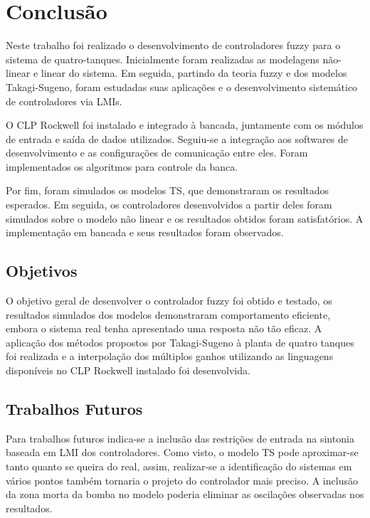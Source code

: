 %

\chapter{Conclusão} \label{capConclusao}
Neste trabalho foi realizado o desenvolvimento de controladores fuzzy para o sistema de quatro-tanques. Inicialmente foram realizadas as modelagens não-linear e linear do sistema. Em seguida, partindo da teoria fuzzy e dos modelos Takagi-Sugeno, foram estudadas suas aplicações e o desenvolvimento sistemático de controladores via LMIs.

O CLP Rockwell foi instalado e integrado à bancada, juntamente com os módulos de entrada e saída de dados utilizados. Seguiu-se a integração aos softwares de desenvolvimento e as configurações de comunicação entre eles. Foram implementados os algoritmos para controle da banca.

Por fim, foram simulados os modelos TS, que demonstraram os resultados esperados. Em seguida, os controladores desenvolvidos a partir deles foram simulados sobre o modelo não linear e os resultados obtidos foram satisfatórios. A implementação em bancada e seus resultados foram observados.

\section{Objetivos}
O objetivo geral de desenvolver o controlador fuzzy foi obtido e testado, os resultados simulados dos modelos demonstraram comportamento eficiente, embora o sistema real tenha apresentado uma resposta não tão eficaz. A aplicação dos métodos propostos por Takagi-Sugeno à planta de quatro tanques foi realizada e a interpolação dos múltiplos ganhos utilizando as linguagens disponíveis no CLP Rockwell instalado foi desenvolvida.

\section{Trabalhos Futuros}
Para trabalhos futuros indica-se a inclusão das restrições de entrada na sintonia baseada em LMI dos controladores. Como visto, o modelo TS pode aproximar-se tanto quanto se queira do real, assim, realizar-se a identificação do sistemas em vários pontos também tornaria o projeto do controlador mais preciso. A inclusão da zona morta da bomba no modelo poderia eliminar as oscilações observadas nos resultados.


%


